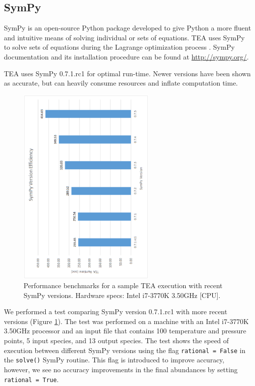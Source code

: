 \subsection{SymPy}
\label{sympy}
  SymPy is an open-source Python package developed to give Python a
  more fluent and intuitive means of solving individual or sets of
  equations.  TEA uses SymPy to solve sets of equations during the
  Lagrange optimization process \citep[Section 3 Equation
  27]{BlecicEtal2016-TEAtheory}. SymPy documentation and its
  installation procedure can be found at \href{http://sympy.org/}
  {\tttm http://sympy.org/}.
  
  TEA uses SymPy 0.7.1.rc1 for optimal run-time. Newer versions have
  been shown as accurate, but can heavily consume resources and
  inflate computation time.
  

\begin{figure}[ht]
\vspace{-0.4cm}
\centerline{\includegraphics[angle=-90, width=0.6\textwidth]{figs/SymPyPlot.ps}}
\caption{Performance benchmarks for a sample TEA execution with recent
  SymPy versions. Hardware specs: Intel i7-3770K 3.50GHz [CPU].}
\label{fig:SymPy}
\end{figure}


  We performed a test comparing SymPy version 0.7.1.rc1 with more
  recent versions (Figure \ref{fig:SymPy}). The test was performed on
  a machine with an Intel i7-3770K 3.50GHz processor and an input file
  that contains 100 temperature and pressure points, 5 input species,
  and 13 output species. The test shows the speed of execution between
  different SymPy versions using the flag \texttt{rational = False} in
  the \texttt{solve()} SymPy routine. This flag is introduced to
  improve accuracy, however, we see no accuracy improvements in the
  final abundances by setting \texttt{rational = True}.
  
